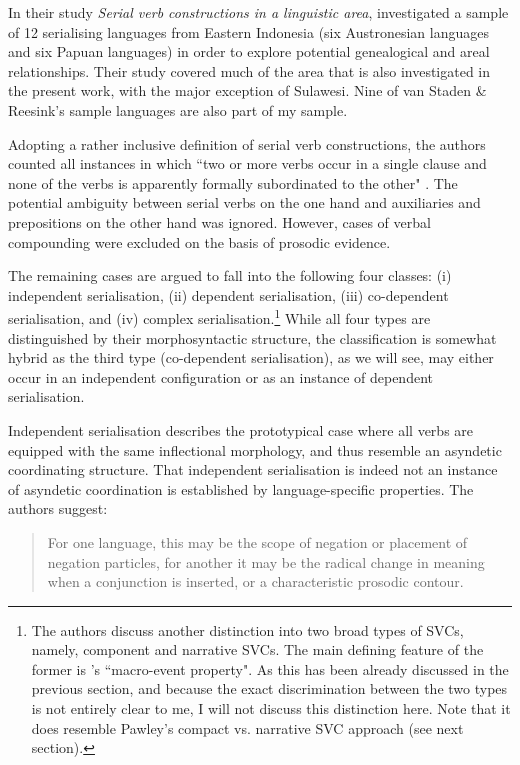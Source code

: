 In their study \textit{Serial verb constructions in a linguistic area}, \citet{vanstaden2008serial} investigated a sample of 12 serialising languages from Eastern Indonesia (six Austronesian languages and six Papuan languages) in order to explore potential genealogical and areal relationships. Their study covered much of the area that is also investigated in the present work, with the major exception of Sulawesi. Nine of van Staden \& Reesink's sample languages are also part of my sample. 

Adopting a rather inclusive definition of serial verb constructions, the authors counted all instances in which ``two or more verbs occur in a single clause and none of the verbs is apparently formally subordinated to the other" \citep[22]{vanstaden2008serial}. The potential ambiguity between serial verbs on the one hand and auxiliaries and prepositions on the other hand was ignored. However, cases of verbal compounding were excluded on the basis of prosodic evidence. 

The remaining cases are argued to fall into the following four classes: (i) independent serialisation, (ii) dependent serialisation, (iii) co-dependent serialisation, and (iv) complex serialisation.\footnote{The authors discuss another distinction into two broad types of SVCs, namely, component and narrative SVCs. The main defining feature of the former is \citeauthor{bohnemeyer2007principles}'s ``macro-event property". As this has been already discussed in the previous section, and because the exact discrimination between the two types is not entirely clear to me, I will not discuss this distinction here. Note that it does resemble Pawley's compact vs. narrative SVC approach (see next section).} While all four types are distinguished by their morphosyntactic structure, the classification is somewhat hybrid as the third type (co-dependent serialisation), as we will see, may either occur in an independent configuration or as an instance of dependent serialisation.

Independent serialisation describes the prototypical case where all verbs are equipped with the same inflectional morphology, and thus resemble an asyndetic coordinating structure. That independent serialisation is indeed not an instance of asyndetic coordination is established by language-specific properties. The authors suggest:

\begin{quote}For one language, this may be the scope of negation or placement of negation particles, for another it may be the radical change in meaning when a conjunction is inserted, or a characteristic prosodic contour. \citep[23]{vanstaden2008serial}\end{quote}
\newpage


